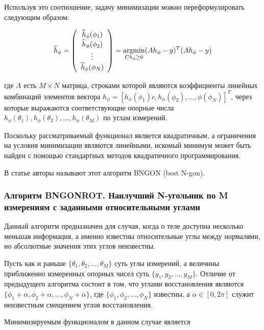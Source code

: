 \documentclass[a4paper, 12pt, titlepage]{article}
\theoremstyle{definition}
\theoremstyle{plain}
\theoremstyle{plain}
\begin{document}
Используя это соотношение, задачу минимизации можно переформулировать следующим
образом:

\begin{equation}
\widehat{h}_{\phi} = \left(
\begin{array}{c}
 \widehat{h}_{\phi}(\phi_{1}) \\
 \widehat{h}_{\phi}(\phi_{2}) \\
 \vdots \\
 \widehat{h}_{\phi}(\phi_{N}) \\
\end{array}
\right) = \operatornamewithlimits{argmin}_{C h_{\phi} \geq 0} (A h_{\phi} -
y)^{T} (A h_{\phi} - y)
\end{equation}

где $A$ есть $M \times N$ матрица, строками которой являются коэффициенты
линейных комбинаций элементов вектора $h_{\phi} = [h_{\phi}(\phi_{1})c,
h_{\phi}(\phi_{2}), \ldots, {\phi}(\phi_{N})]^{T}$, через которые
выражаются соответствующие опорные числа $h_{\phi}(\theta_{1}),
h_{\phi}(\theta_{2}), \ldots, h_{\phi}(\theta_{M})$ по углам измерений.

Поскольку рассматриваемый функционал является квадратичным, а ограничения на
условия минимизации являются линейными, искомый минимум может быть найден с
помощью стандартных методов квадратичного программирования.

В статье авторы называют этот алгоритм BNGON (best N-gon).

\subsubsection{Алгоритм BNGONROT. Наилучший N-угольник по M измерениям с
заданными относительными углами}

Данный алгоритм предназначен для случая, когда о теле доступна несколько
меньшая информация, а именно известны относительные углы между нормалями, но
абсолютные значения этих углов неизвестны.

Пусть как и раньше $\{\theta_{1}, \theta_{2}, \ldots,
\theta_{M}\}$ суть углы измерений, а величины приближенно измеренных опорных
чисел суть $\{y_{1}, y_{2}, \ldots, y_{M}\}$. Отличие от предыдущего алгоритма
состоит в том, что углами восстановления являются $\{\phi_{1} + \alpha,
\phi_{2} + \alpha, \ldots, \phi_{N} + \alpha\}$, где $\{\phi_{1}, \phi_{2},
\ldots, \phi_{N}\}$ известны, а $\alpha \in [0, 2 \pi]$ служит неизвестным
смещением углов восстановления.

Минимизируемым функционалом в данном случае является
\end{document}
